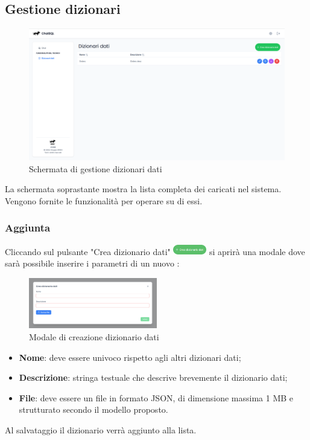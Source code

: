 \subsection{Gestione dizionari}
\begin{figure}[H]
  \centering
  \includegraphics[width=1\textwidth]{assets/dd_list.png}
  \caption{Schermata di gestione dizionari dati}
\end{figure}
\par La schermata soprastante mostra la lista completa dei  caricati nel sistema. Vengono fornite le funzionalità per operare su di essi.

\subsubsection{Aggiunta }
Cliccando sul pulsante "Crea dizionario dati" \includegraphics[height=1.2em]{assets/dd_create_button.png} si aprirà una modale dove sarà possibile inserire i parametri di un nuovo :
\begin{figure}[H]
  \centering
  \includegraphics[width=0.5\textwidth]{assets/dd_modal_create.png}
  \caption{Modale di creazione dizionario dati}
\end{figure}
\begin{itemize}
  \item \textbf{Nome}: deve essere univoco rispetto agli altri dizionari dati;
  \item \textbf{Descrizione}: stringa testuale che descrive brevemente il dizionario dati;
  \item \textbf{File}: deve essere un file in formato JSON, di dimensione massima 1 MB e strutturato secondo il modello proposto.
\end{itemize}
Al salvataggio il dizionario verrà aggiunto alla lista.

